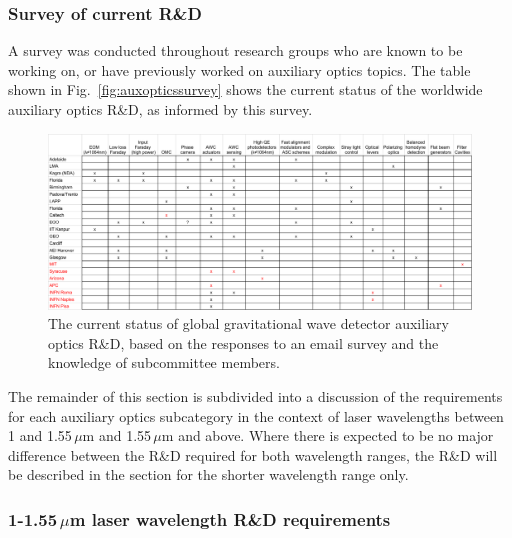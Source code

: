\subsubsection{Survey of current R\&D}
A survey was conducted throughout research groups who are known to be working on, or have previously worked on auxiliary optics topics. The table shown in Fig.~\ref{fig:auxopticssurvey} shows the current status of the worldwide auxiliary optics R\&D, as informed by this survey. 
\begin{figure}[htb]
\centering
\includegraphics[scale=0.65]{Figures/auxopticssurvey.pdf}
\caption{The current status of global gravitational wave detector auxiliary optics R\&D, based on the responses to an email survey and the knowledge of subcommittee members.}\label{figauxopticsssurvey}
\end{figure}

The remainder of this section is subdivided into a discussion of the requirements for each auxiliary optics subcategory in the context of laser wavelengths between 1 and 1.55\,$\mu$m and 1.55\,$\mu$m and above. Where there is expected to be no major difference between the R\&D required for both wavelength ranges, the R\&D will be described in the section for the shorter wavelength range only. 

\subsubsection{1-1.55\,$\mu$m laser wavelength R\&D requirements}
